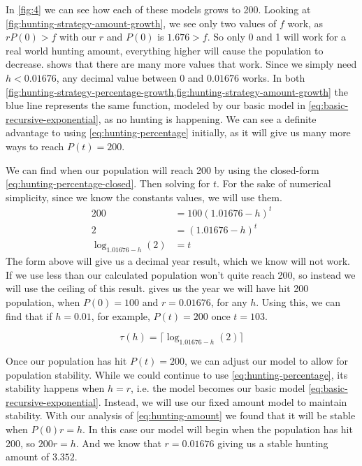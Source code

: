 \documentclass{article}
\begin{document}
In \cref{fig:4} we can see how each of these models grows to 200. Looking at \cref{fig:hunting-strategy-amount-growth}, we see only two values of $f$ work, as $rP(0) > f$ with our $r$ and $P(0)$ is $1.676 > f$. So only 0 and 1 will work for a real world hunting amount, everything higher will cause the population to decrease.  shows that there are many more values that work. Since we simply need $h < 0.01676$, any decimal value between $0$ and $0.01676$ works. In both \cref{fig:hunting-strategy-percentage-growth,fig:hunting-strategy-amount-growth} the blue line represents the same function, modeled by our basic model in  \cref{eq:basic-recursive-exponential}, as no hunting is happening. We can see a definite advantage to using \cref{eq:hunting-percentage} initially, as it will give us many more ways to reach $P(t)=200$.

We can find when our population will reach 200 by using the closed-form \cref{eq:hunting-percentage-closed}. Then solving for $t$. For the sake of numerical simplicity, since we know the constants values, we will use them.
\begin{align*}
    200 &= 100(1.01676-h)^t \\
    2 &= (1.01676-h)^t \\
    \log_{1.01676-h}(2) &= t
\end{align*}
The form above will give us a decimal year result, which we know will not work. If we use less than our calculated population won't quite reach 200, so instead we will use the ceiling of this result.  gives us the year we will have hit 200 population, when $P(0) = 100$ and $r = 0.01676$, for any $h$. Using this, we can find that if $h=0.01$, for example, $P(t) = 200$ once $t = 103$.

\begin{equation}\label{eq:hunting-strategy-time}
    \tau(h) = \lceil\log_{1.01676-h}(2)\rceil
\end{equation}

Once our population has hit $P(t)=200$, we can adjust our model to allow for population stability. While we could continue to use \cref{eq:hunting-percentage}, its stability happens when $h=r$, i.e. the model becomes our basic model \cref{eq:basic-recursive-exponential}. Instead, we will use our fixed amount model to maintain stability. With our analysis of \cref{eq:hunting-amount} we found that it will be stable when $P(0)r = h$. In this case our model will begin when the population has hit 200, so $200r=h$. And we know that $r = 0.01676$ giving us a stable hunting amount of $3.352$.
\end{document}
